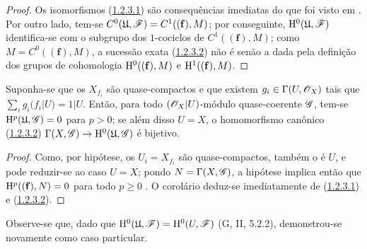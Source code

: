 \begin{proof}
Os isomorfismos (\hyperref[III.1.2.3.1]{1.2.3.1}) são consequências imediatas do que foi visto em .
Por outro lado, tem-se $C^0(\mathfrak{U},\mathscr{F})=C^1((\mathbf{f}),M)$; por conseguinte, $\mathrm{H}^0(\mathfrak{U},\mathscr{F})$ identifica-se com o subgrupo dos $1$-cociclos de $C^1((\mathbf{f}),M)$; como $M=C^0((\mathbf{f}),M)$, a sucessão exata (\hyperref[III.1.2.3.2]{1.2.3.2}) não é senão a dada pela definição dos grupos de cohomologia $\mathrm{H}^0((\mathbf{f}),M)$ e $\mathrm{H}^1((\mathbf{f}),M)$.
\end{proof}

\begin{corollary}[1.2.4]
\label{III.1.2.4}
Suponha-se que os $X_{f_i}$ são quase-compactos e que existem $g_i\in\Gamma(U,\mathscr{O}_X)$ tais que $\sum_i g_i(f_i|U)=1|U$.
Então, para todo $(\mathscr{O}_X|U)$-módulo quase-coerente $\mathscr{G}$, tem-se $\mathrm{H}^p(\mathfrak{U},\mathscr{G})=0$ para $p>0$; se além disso $U=X$, o homomorfismo canônico (\hyperref[III.1.2.3.2]{1.2.3.2}) $\Gamma(X,\sh{G})\to\HH^0(\mathfrak{U},\sh{G})$ é bijetivo.
\end{corollary}

\begin{proof}
Como, por hipótese, os $U_i=X_{f_i}$ são quase-compactos, também o é $U$, e pode reduzir-se ao caso $U=X$; pondo $N=\Gamma(X,\mathscr{G})$, a hipótese implica então que $\mathrm{H}^p((\mathbf{f}),N)=0$ para todo $p\geq 0$ .
O corolário deduz-se imediatamente de (\hyperref[III.1.2.3.1]{1.2.3.1}) e (\hyperref[III.1.2.3.2]{1.2.3.2}).
\end{proof}

Observe-se que, dado que $\mathrm{H}^0(\mathfrak{U},\mathscr{F})=\mathrm{H}^0(U,\mathscr{F})$ (G, II, 5.2.2), demonstrou-se novamente  como caso particular.

